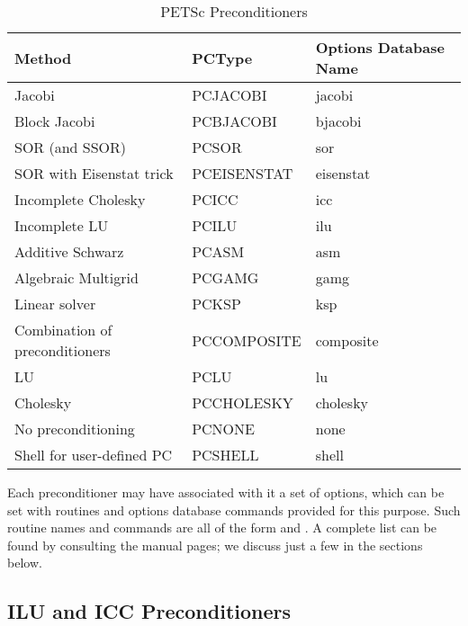 \begin{table}
\begin{center}
\begin{tabular}{lll}
{\bf Method}    &{\bf PCType}   & {\bf Options Database Name}\\
\hline
Jacobi                               & PCJACOBI      & jacobi\\
Block Jacobi                         & PCBJACOBI     & bjacobi\\
SOR (and SSOR)                       & PCSOR         & sor\\
SOR with Eisenstat trick             & PCEISENSTAT   & eisenstat\\
Incomplete Cholesky                  & PCICC         & icc\\
Incomplete LU                        & PCILU         & ilu\\
Additive Schwarz                     & PCASM         & asm\\
Algebraic Multigrid                  & PCGAMG         & gamg\\
Linear solver                        & PCKSP         & ksp \\
Combination of preconditioners       & PCCOMPOSITE   & composite \\
\hline
LU                                   & PCLU          & lu\\
Cholesky                             & PCCHOLESKY    & cholesky\\
No preconditioning                   & PCNONE        & none\\
Shell for user-defined PC            & PCSHELL       & shell\\
\hline
\end{tabular}
\end{center}
\caption{PETSc Preconditioners}
\label{tab_pcdefaults}
\end{table}

Each preconditioner may have associated with it a set of options,
which can be set with routines and options database commands provided
for this purpose.  Such routine names and commands are all of the form
 and .  A
complete list can be found by consulting the manual pages; we discuss
just a few in the sections below.

\subsection{ILU and ICC Preconditioners}
\label{sec_ilu_icc}

